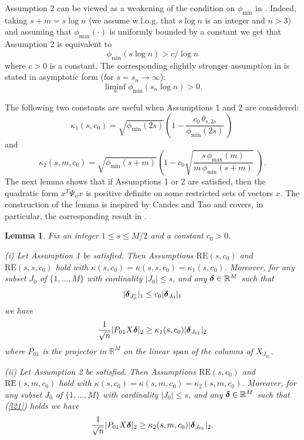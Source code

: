\documentclass[dvips,aos]{imsart}
\numberwithin{equation}{section}
\theoremstyle{plain}
\newtheorem{lemma}[thm]{Lemma}
\def\RR{\mathbb R}
\def\RE#1#2{$\text{RE}(#1,#2)$}
\def\REm#1#2#3{$\text{RE}(#1,#2,#3)$}
\newcommand{\bD}{\mbox{\boldmath$\delta$}}
\begin{document}
Assumption 2 can be viewed as a weakening of the condition on
$\phi_{\min}$ in \cite{my06}. Indeed, taking $s+m=s\log n$ (we
assume w.l.o.g. that $s\log n$ is an integer and $n>3$) and assuming
that $\phi_{\max}(\cdot)$ is uniformly bounded by a constant we get
that Assumption 2 is equivalent to
\begin{equation*}%
\phi_{\min}(s \log n) > c/\log n
\end{equation*}
where $c>0$ is a constant. The corresponding slightly stronger
assumption in \cite{my06} is stated in asymptotic form (for
$s=s_n\to\infty$):
$$
\liminf_{n}\phi_{\min}(s_n \log n) > 0.
$$




The following two constants are useful when Assumptions 1 and 2 are
considered:
$$
\kappa_1 (s,c_0) = \sqrt{\phi_{\min}(2s)}\left(1-
\frac{c_0\,\theta_{s,2s}}{\phi_{\min}(2s)}\ \right)\,
$$
and
$$
\kappa_2 (s,m,c_0) = \sqrt{\phi_{\min}(s+m)}\left(1-
c_0\sqrt{\frac{s\,\phi_{\max}(m)}{m\,\phi_{\min}(s+m)}}\ \right)\, .
$$
The next lemma shows that if Assumptions 1 or 2 are satisfied, then
the quadratic form $x^T\Psi_n x$ is positive definite  on some
restricted sets of vectors $x$. The construction of the lemma is
inspired by Candes and Tao \cite{ct07} and covers, in particular,
the corresponding result in \cite{ct07}.

\begin{lemma}\label{l2} Fix an integer $1\le s \le M/2$ and a
constant $c_0>0$.

(i) Let Assumption 1 be satisfied. Then Assumptions \RE s{c_0} and
\REm ss{c_0} hold with $\kappa (s,c_0) =\kappa (s,s,c_0)=\kappa_1
(s,c_0)$. Moreover, for any subset $J_0$ of $\{1,\dots,M\}$ with
cardinality $|J_0|\le s$, and any $\bD\in \RR^M$ such that
\begin{equation}\label{l21}
|\bD_{J_0^c}|_1 \le c_0 |\bD_{J_0}|_1
\end{equation}
we have
\begin{equation*}%
\frac{1}{\sqrt{n}}|P_{01} X \bD|_2 \ge  \kappa_1 (s,c_0)
|\bD_{J_{01}}|_2
\end{equation*}
where $P_{01}$ is the projector in $\RR^M$ on the linear span of the
columns of $X_{J_{01}}$.

(ii) Let Assumption 2 be satisfied. Then Assumptions \RE s{c_0} and
\REm sm{c_0} hold with $\kappa (s,c_0) =\kappa (s,m,c_0)=\kappa_2
(s,m,c_0)$. Moreover, for any subset $J_0$ of $\{1,\dots,M\}$ with
cardinality $|J_0|\le s$, and any $\bD\in \RR^M$ such that
(\ref{l21}) holds we have
\begin{equation*}%
\frac{1}{\sqrt{n}}|P_{01} X \bD|_2 \ge  \kappa_2 (s,m,c_0)
|\bD_{J_{01}}|_2.
\end{equation*}
\end{lemma}
\end{document}
